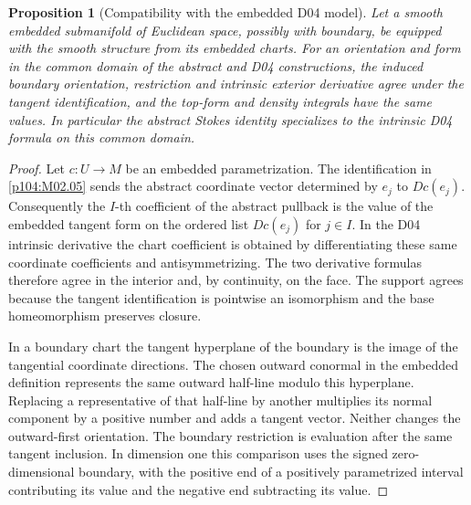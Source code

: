 \documentclass[11pt,oneside,openany]{book}
\newtheorem{proposition}[theorem]{Proposition}
\theoremstyle{definition}
\theoremstyle{remark}
\begin{document}
\begin{proposition}[Compatibility with the embedded D04 model]
\label{p104:M10.08}
Let a smooth embedded submanifold of Euclidean space, possibly with
boundary, be equipped with the smooth structure from its embedded
charts. For an orientation and form in the common domain of the
abstract and D04 constructions, the induced boundary orientation,
restriction and intrinsic exterior derivative agree under the tangent
identification, and the top-form and density integrals have the same
values. In particular the abstract Stokes identity specializes to
the intrinsic D04 formula on this common domain.
\end{proposition}
\begin{proof}
Let \(c:U\to M\) be an embedded parametrization. The identification
in \cref{p104:M02.05} sends the abstract coordinate vector determined
by \(e_j\) to \(Dc(e_j)\). Consequently the \(I\)-th coefficient of
the abstract pullback is the value of the embedded tangent form on
the ordered list \(Dc(e_j)\) for \(j\in I\). In the D04 intrinsic
derivative the chart coefficient is obtained by differentiating
these same coordinate coefficients and antisymmetrizing. The
two derivative formulas therefore agree in the interior and,
by continuity, on the face. The support agrees because the
tangent identification is pointwise an isomorphism and the
base homeomorphism preserves closure.

In a boundary chart the tangent hyperplane of the boundary is the
image of the tangential coordinate directions. The chosen outward
conormal in the embedded definition represents the same outward
half-line modulo this hyperplane. Replacing a representative of
that half-line by another multiplies its normal component by a
positive number and adds a tangent vector. Neither changes the
outward-first orientation. The boundary restriction is evaluation
after the same tangent inclusion. In dimension one this comparison
uses the signed zero-dimensional boundary, with the positive end
of a positively parametrized interval contributing its value
and the negative end subtracting its value.


\end{proof}
\end{document}
